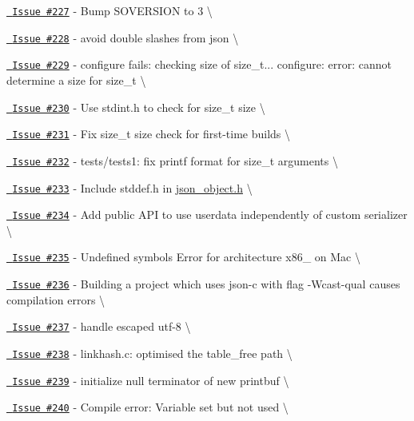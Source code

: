 \begin{DoxyItemize}
\item \href{https://github.com/json-c/json-c/issues/227}{\texttt{ Issue \#227}} -\/ Bump SOVERSION to 3 \textbackslash{}
\item \href{https://github.com/json-c/json-c/issues/228}{\texttt{ Issue \#228}} -\/ avoid double slashes from json \textbackslash{}
\item \href{https://github.com/json-c/json-c/issues/229}{\texttt{ Issue \#229}} -\/ configure fails\+: checking size of size\+\_\+t... configure\+: error\+: cannot determine a size for size\+\_\+t \textbackslash{}
\item \href{https://github.com/json-c/json-c/issues/230}{\texttt{ Issue \#230}} -\/ Use stdint.\+h to check for size\+\_\+t size \textbackslash{}
\item \href{https://github.com/json-c/json-c/issues/231}{\texttt{ Issue \#231}} -\/ Fix size\+\_\+t size check for first-\/time builds \textbackslash{}
\item \href{https://github.com/json-c/json-c/issues/232}{\texttt{ Issue \#232}} -\/ tests/tests1\+: fix printf format for size\+\_\+t arguments \textbackslash{}
\item \href{https://github.com/json-c/json-c/issues/233}{\texttt{ Issue \#233}} -\/ Include stddef.\+h in \mbox{\hyperlink{json__object_8h}{json\+\_\+object.\+h}} \textbackslash{}
\item \href{https://github.com/json-c/json-c/issues/234}{\texttt{ Issue \#234}} -\/ Add public API to use userdata independently of custom serializer \textbackslash{}
\item \href{https://github.com/json-c/json-c/issues/235}{\texttt{ Issue \#235}} -\/ Undefined symbols Error for architecture x86\+\_ on Mac \textbackslash{}
\item \href{https://github.com/json-c/json-c/issues/236}{\texttt{ Issue \#236}} -\/ Building a project which uses json-\/c with flag -\/Wcast-\/qual causes compilation errors \textbackslash{}
\item \href{https://github.com/json-c/json-c/issues/237}{\texttt{ Issue \#237}} -\/ handle escaped utf-\/8 \textbackslash{}
\item \href{https://github.com/json-c/json-c/issues/238}{\texttt{ Issue \#238}} -\/ linkhash.\+c\+: optimised the table\+\_\+free path \textbackslash{}
\item \href{https://github.com/json-c/json-c/issues/239}{\texttt{ Issue \#239}} -\/ initialize null terminator of new printbuf \textbackslash{}
\item \href{https://github.com/json-c/json-c/issues/240}{\texttt{ Issue \#240}} -\/ Compile error\+: Variable set but not used \textbackslash{}

\end{DoxyItemize}
